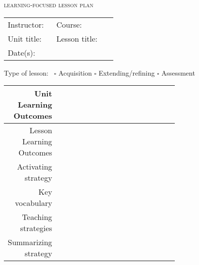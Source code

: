 \documentclass[letterpaper,11pt]{article}
\newcommand\B{\rule[-10ex]{0pt}{0pt}} %
\newcommand\Blong{\rule[-40ex]{0pt}{0pt}} %
\newcommand\textlcsc[1]{\textsc{\MakeLowercase{#1}}}
\begin{document}
\begin{center}
  \Large \textlcsc{Learning-focused lesson plan}
\end{center}

\vspace{5mm}

\begin{tabular}{p{0.4\linewidth} p{0.5\linewidth}}
  Instructor: & Course: \\
  Unit title: & Lesson title: \\
  Date(s): & \\
\end{tabular}

\vspace{5mm}
Type of lesson:~ $\square$ Acquisition \hspace{5mm} $\square$ Extending/refining  \hspace{5mm} $\square$ Assessment

\vspace{5mm}

\begin{tabular}{|r | p{0.7\linewidth}|}
  \hline
  Unit Learning Outcomes & \\
  \hline
  Lesson Learning Outcomes \B & \\
  \hline
  Activating strategy \B & \\
  \hline
  Key vocabulary \B & \\
  \hline
  Teaching strategies \Blong & \\
  \hline
  Summarizing strategy \B & \\
  \hline
\end{tabular}
\end{document}
